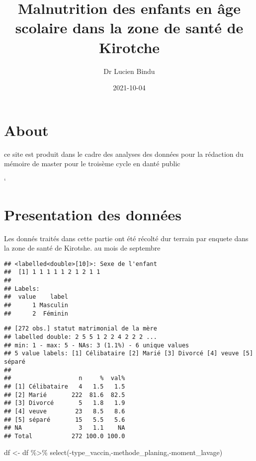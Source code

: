 \documentclass[
]{book}
\title{Malnutrition des enfants en âge scolaire dans la zone de santé de Kirotche}
\author{Dr Lucien Bindu}
\date{2021-10-04}
\newenvironment{Shaded}{\begin{snugshade}}{\end{snugshade}}
\newcommand{\FunctionTok}[1]{\textcolor[rgb]{0.00,0.00,0.00}{#1}}
\newcommand{\NormalTok}[1]{#1}
\newcommand{\OtherTok}[1]{\textcolor[rgb]{0.56,0.35,0.01}{#1}}
\newcommand{\SpecialCharTok}[1]{\textcolor[rgb]{0.00,0.00,0.00}{#1}}
\begin{document}
\maketitle

{
\setcounter{tocdepth}{1}
\tableofcontents
}
\hypertarget{about}{%
\chapter{About}\label{about}}

ce site est produit dans le cadre des analyses des données pour la rédaction du mémoire de master pour le troisème cycle en danté public

`

\hypertarget{presentation-des-donnuxe9es}{%
\chapter{Presentation des données}\label{presentation-des-donnuxe9es}}

Les donnés traités dans cette partie ont été récolté dur terrain par enquete dans la zone de santé de Kirotshe. au mois de septembre

\begin{verbatim}
## <labelled<double>[10]>: Sexe de l'enfant
##  [1] 1 1 1 1 1 2 1 2 1 1
## 
## Labels:
##  value    label
##      1 Masculin
##      2  Féminin
\end{verbatim}

\begin{Shaded}
\end{Shaded}

\begin{verbatim}
## [272 obs.] statut matrimonial de la mère
## labelled double: 2 5 5 1 2 2 4 2 2 2 ...
## min: 1 - max: 5 - NAs: 3 (1.1%) - 6 unique values
## 5 value labels: [1] Célibataire [2] Marié [3] Divorcé [4] veuve [5] séparé
## 
##                   n     %  val%
## [1] Célibataire   4   1.5   1.5
## [2] Marié       222  81.6  82.5
## [3] Divorcé       5   1.8   1.9
## [4] veuve        23   8.5   8.6
## [5] séparé       15   5.5   5.6
## NA                3   1.1    NA
## Total           272 100.0 100.0
\end{verbatim}

\begin{Shaded}
\begin{Highlighting}[]
\NormalTok{df }\OtherTok{\textless{}{-}}\NormalTok{ df }\SpecialCharTok{\%\textgreater{}\%} \FunctionTok{select}\NormalTok{(}\SpecialCharTok{{-}}\NormalTok{type\_vaccin,}\SpecialCharTok{{-}}\NormalTok{methode\_planing,}\SpecialCharTok{{-}}\NormalTok{moment\_lavage)}
\end{Highlighting}
\end{Shaded}
\end{document}
